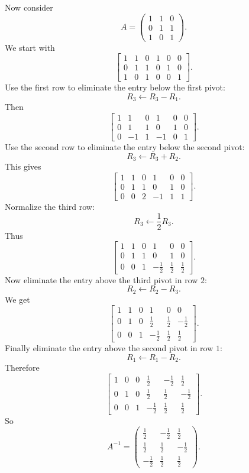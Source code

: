 Now consider
\[
A=\begin{pmatrix}
1&1&0\\
0&1&1\\
1&0&1
\end{pmatrix}.
\]
We start with
\[
\left[\begin{array}{ccc|ccc}
1&1&0&1&0&0\\
0&1&1&0&1&0\\
1&0&1&0&0&1
\end{array}\right].
\]
Use the first row to eliminate the entry below the first pivot:
\[
R_3\leftarrow R_3-R_1.
\]
Then
\[
\left[\begin{array}{ccc|ccc}
1&1&0&1&0&0\\
0&1&1&0&1&0\\
0&-1&1&-1&0&1
\end{array}\right].
\]
Use the second row to eliminate the entry below the second pivot:
\[
R_3\leftarrow R_3+R_2.
\]
This gives
\[
\left[\begin{array}{ccc|ccc}
1&1&0&1&0&0\\
0&1&1&0&1&0\\
0&0&2&-1&1&1
\end{array}\right].
\]
Normalize the third row:
\[
R_3\leftarrow \frac12 R_3.
\]
Thus
\[
\left[\begin{array}{ccc|ccc}
1&1&0&1&0&0\\
0&1&1&0&1&0\\
0&0&1&-\frac12&\frac12&\frac12
\end{array}\right].
\]
Now eliminate the entry above the third pivot in row \(2\):
\[
R_2\leftarrow R_2-R_3.
\]
We get
\[
\left[\begin{array}{ccc|ccc}
1&1&0&1&0&0\\
0&1&0&\frac12&\frac12&-\frac12\\
0&0&1&-\frac12&\frac12&\frac12
\end{array}\right].
\]
Finally eliminate the entry above the second pivot in row \(1\):
\[
R_1\leftarrow R_1-R_2.
\]
Therefore
\[
\left[\begin{array}{ccc|ccc}
1&0&0&\frac12&-\frac12&\frac12\\
0&1&0&\frac12&\frac12&-\frac12\\
0&0&1&-\frac12&\frac12&\frac12
\end{array}\right].
\]
So
\[
A^{-1}=\begin{pmatrix}
\frac12&-\frac12&\frac12\\
\frac12&\frac12&-\frac12\\
-\frac12&\frac12&\frac12
\end{pmatrix}.
\]

